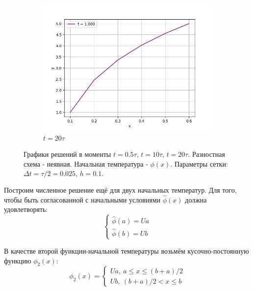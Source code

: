 \documentclass[12pt]{article}%
\begin{document}
\begin{figure}[H]
\begin{subfigure}{0.32\textwidth}
    \includegraphics[width=\textwidth]{implicit-time1.000.png}
    \caption{$t = 20 \tau$}
\end{subfigure}
\caption{Графики решений в моменты $t = 0.5 \tau$, $t = 10 \tau$, $t = 20 \tau$. Разностная схема - неявная. Начальная температура - $\phi(x)$. Параметры сетки: $\Delta t = \tau / 2 = 0.025$, $h=0.1$.}
\end{figure}

Построим численное решение ещё для двух начальных температур. Для того, чтобы быть согласованной с начальными условиями $\hat{\phi}(x)$ должна удовлетворять:
\begin{equation*}
\begin{cases}
\hat{\phi}(a) = Ua \\
\hat{\phi}(b) = Ub
\end{cases}
\end{equation*}

В качестве второй функции-начальной температуры возьмём кусочно-постоянную функцию $\phi_2(x)$:
\begin{equation*}
\phi_2(x) = 
\begin{cases}
    Ua,\ a \le x \le (b + a)/2 \\
    Ub,\ (b + a)/2 < x \le b
\end{cases}
\end{equation*}
\end{document}
